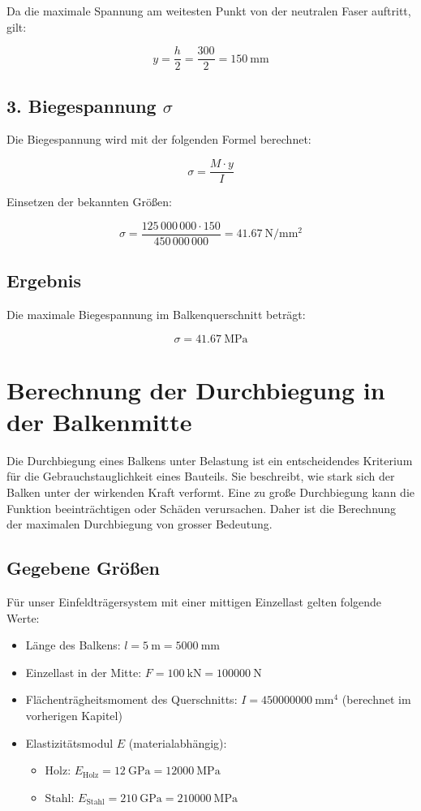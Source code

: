 Da die maximale Spannung am weitesten Punkt von der neutralen Faser auftritt, gilt:

\[
y = \frac{h}{2} = \frac{300}{2} = \SI{150}{\milli\meter}
\]

\subsection*{3. Biegespannung $\sigma$}

Die Biegespannung wird mit der folgenden Formel berechnet:

\[
\sigma = \frac{M \cdot y}{I}
\]

Einsetzen der bekannten Größen:

\[
\sigma = \frac{125\,000\,000 \cdot 150}{450\,000\,000} = \SI{41.67}{\newton\per\milli\meter\squared}
\]

\subsection*{Ergebnis}

Die maximale Biegespannung im Balkenquerschnitt beträgt:

\[
\boxed{\sigma = \SI{41.67}{\mega\pascal}}
\]


\section*{Berechnung der Durchbiegung in der Balkenmitte}

Die Durchbiegung eines Balkens unter Belastung ist ein entscheidendes Kriterium für die Gebrauchstauglichkeit eines Bauteils. 
Sie beschreibt, wie stark sich der Balken unter der wirkenden Kraft verformt. 
Eine zu große Durchbiegung kann die Funktion beeinträchtigen oder Schäden verursachen. 
Daher ist die Berechnung der maximalen Durchbiegung von grosser Bedeutung.

\subsection*{Gegebene Größen}

Für unser Einfeldträgersystem mit einer mittigen Einzellast gelten folgende Werte:

\begin{itemize}
  \item Länge des Balkens: \( l = \SI{5}{\meter} = \SI{5000}{\milli\meter} \)
  \item Einzellast in der Mitte: \( F = \SI{100}{\kilo\newton} = \SI{100000}{\newton} \)
  \item Flächenträgheitsmoment des Querschnitts: \( I = \SI{450000000}{\milli\meter^4} \) (berechnet im vorherigen Kapitel)
  \item Elastizitätsmodul \( E \) (materialabhängig):
  \begin{itemize}
    \item Holz: \( E_{\text{Holz}} = \SI{12}{\giga\pascal} = \SI{12000}{\mega\pascal} \)
    \item Stahl: \( E_{\text{Stahl}} = \SI{210}{\giga\pascal} = \SI{210000}{\mega\pascal} \)
  \end{itemize}
\end{itemize}

